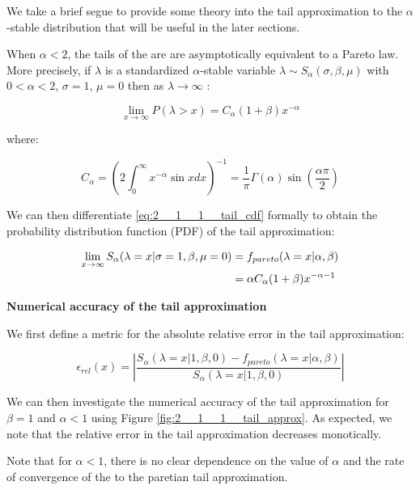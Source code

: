\documentclass[../main.tex]{subfiles}
\begin{document}
We take a brief segue to provide some theory into the tail approximation to the $\alpha$-stable distribution that will be useful in the later sections. 

When $\alpha < 2$, the tails of the \asd are are asymptotically equivalent to a Pareto law. More precisely, if $\lambda$ is a standardized $\alpha$-stable variable $\lambda \sim S_\alpha(\sigma, \beta, \mu)$ with $0 < \alpha < 2$, $\sigma = 1$, $\mu = 0$ then as $\lambda \rightarrow \infty$ \cite{samoradnitsky2017stable}:

\begin{equation}
	\lim_{x \rightarrow \infty} P(\lambda > x) = C_\alpha (1+\beta) x^{-\alpha}
	\label{eq:2__1__1__tail_cdf}
\end{equation}

where: 

\begin{equation*}
	C_\alpha = \left( 2\int_{0}^{\infty} x^{-\alpha} \sin x dx \right)^{-1} = \frac{1}{\pi}\Gamma(\alpha)\sin(\frac{\alpha \pi}{2})
\end{equation*}

We can then differentiate \autoref{eq:2__1__1__tail_cdf} formally to obtain the probability distribution function (PDF) of the tail approximation: 

\begin{align}
	\lim_{x \rightarrow \infty}S_\alpha(\lambda = x | \sigma = 1, \beta, \mu = 0) &= f_{pareto}(\lambda = x | \alpha, \beta) \notag \\
	&=  \alpha C_\alpha (1+\beta) x^{-\alpha - 1}
\end{align}

\textbf{Numerical accuracy of the tail approximation}

We first define a metric for the absolute relative error in the tail approximation: 

\begin{equation}
	\epsilon_{rel}(x) =  \left| \frac{ S_\alpha(\lambda = x | 1, \beta, 0) - f_{pareto}(\lambda = x | \alpha, \beta) }{S_\alpha(\lambda = x | 1, \beta, 0)  } \right|
\end{equation}

We can then investigate the numerical accuracy of the tail approximation for $\beta = 1$ and $\alpha < 1$ using Figure \ref{fig:2__1__1__tail_approx}. As expected, we note that the relative error in the tail approximation decreases monotically. 

Note that for $\alpha<1$, there is no clear dependence on the value of $\alpha$ and the rate of convergence of the \asd to the paretian tail approximation.
\end{document}
